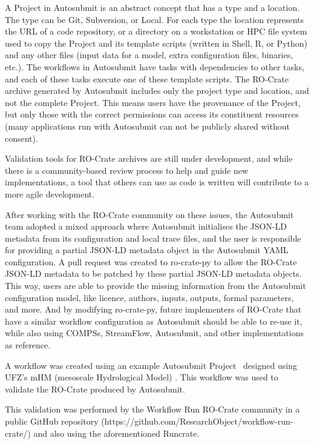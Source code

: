 \documentclass[10pt,letterpaper]{article}
\begin{document}
A Project in Autosubmit is an abstract concept that has a type and a location.
The type can be Git, Subversion, or Local.
For each type the location represents the URL of a code repository, or a directory on a workstation or HPC file system used to copy the Project and its template scripts (written in Shell, R, or Python) and any other files (input data for a model, extra configuration files, binaries, etc.).
The workflows in Autosubmit have tasks with dependencies to other tasks, and each of these tasks execute one of these template scripts.
The RO-Crate archive generated by Autosubmit includes only the project type and location, and not the complete Project.
This means users have the provenance of the Project, but only those with the correct permissions can access its constituent resources (many applications run with Autosubmit can not be publicly shared without consent).

Validation tools for RO-Crate archives are still under development, and while there is a community-based review process to help and guide new implementations, a tool that others can use as code is written will contribute to a more agile development.

After working with the RO-Crate community on these issues, the Autosubmit team adopted a mixed approach where Autosubmit initialises the JSON-LD metadata from its configuration and local trace files, and the user is responsible for providing a partial JSON-LD metadata object in the Autosubmit YAML configuration.
A pull request was created to ro-crate-py to allow the RO-Crate JSON-LD metadata to be patched by these partial JSON-LD metadata objects.
This way, users are able to provide the missing information from the Autosubmit configuration model, like licence, authors, inputs, outputs, formal parameters, and more.
And by modifying ro-crate-py, future implementers of RO-Crate that have a similar workflow configuration as Autosubmit should be able to re-use it, while also using COMPSs, StreamFlow, Autosubmit, and other implementations as reference.

A workflow was created using an example Autosubmit Project~\cite{Kinoshita 2023} designed using UFZ's mHM (mesoscale Hydrological Model)
\cite{Samaniego 2010,Kumar 2013}. This workflow was used to validate the RO-Crate produced by Autosubmit.

This validation was performed by the Workflow Run RO-Crate community in a public GitHub repository (https://github.com/ResearchObject/workflow-run-crate/) and also using the aforementioned Runcrate.
\end{document}
